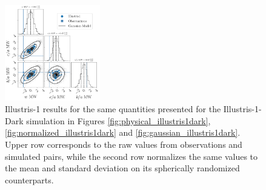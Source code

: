 \documentclass[a4paper,fleqn,usenatbib]{mnras}
\begin{document}
\begin{figure}
\includegraphics[width=0.37\textwidth]{gaussian_model_illustris1_MW_n_11.pdf}
\caption{Illustris-1 results for the same quantities presented for the Illustris-1-Dark
  simulation in Figures  
\ref{fig:physical_illustris1dark}, \ref{fig:normalized_illustris1dark}
and \ref{fig:gaussian_illustris1dark}.
Upper row corresponds to the raw values from observations and
simulated pairs, while the second row normalizes the same values to
the mean and standard deviation on its spherically randomized
counterparts. 
\label{fig:all_plots_illustris1}}
\end{figure}
\end{document}
